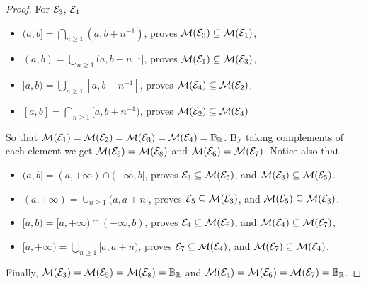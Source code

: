 \documentclass[../../main.tex]{subfiles}
\begin{document}
\begin{proof}
    For ${\cal{E}}_3$, ${\cal{E}}_4$ 
    \begin{itemize}
        \item $(a,b] = \bigcap_{n\geq 1}(a, b+n^{-1})$, proves $\gen{3}\subseteq\gen{1}$,
        \item $(a,b) = \bigcup_{n\geq 1}(a, b-n^{-1}]$, proves $\gen{1}\subseteq\gen{3}$,
        \item $[a,b) = \bigcup_{n\geq 1}[a, b-n^{-1}]$, proves $\gen{4}\subseteq\gen{2}$,
        \item $[a,b] = \bigcap_{n\geq 1}[a, b+n^{-1})$, proves $\gen{2}\subseteq\gen{4}$
    \end{itemize}
    So that $\gen{1}=\gen{2}=\gen{3}=\gen{4}=\borel$. By taking complements of each element we get $\gen{5}=\gen{8}$ and $\gen{6}=\gen{7}$. Notice also that
    \begin{itemize}
        \item $(a,b] = (a,+\infty)\cap (-\infty,b]$, proves ${\cal{E}}_3\subseteq\gen{5}$, and $\gen{3}\subseteq\gen{5}$.
        \item $(a,+\infty) = \cup_{n\geq 1}(a,a+n]$, proves ${\cal{E}}_5\subseteq\gen{3}$, and $\gen{5}\subseteq\gen{3}$.
        \item $[a,b) = [a,+\infty)\cap (-\infty, b)$, proves ${\cal{E}}_4\subseteq\gen{6}$, and $\gen{4}\subseteq\gen{7}$,
        \item $[a,+\infty) = \bigcup_{n\geq 1}[a,a+n)$, proves ${\cal{E}}_7\subseteq\gen{4}$, and $\gen{7}\subseteq\gen{4}$.
    \end{itemize}
    Finally, $\gen{3}=\gen{5}=\gen{8}=\borel$ and $\gen{4}=\gen{6}=\gen{7}=\borel$.
\end{proof}
\end{document}

